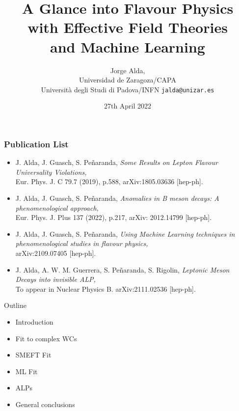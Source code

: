 \documentclass[mathserif, 10pt]{beamer}
\title[A Glance into Flavour Physics...]{A Glance into Flavour Physics \\with Effective Field Theories\\ and Machine Learning}
\author[Jorge Alda]{Jorge Alda,\\ Universidad de Zaragoza/CAPA\\
Università degli Studi di Padova/INFN \hspace{2em} \texttt{jalda@unizar.es} }
\date[PhD Thesis]{27th April 2022}
\begin{document}
\begin{frame}

\titlepage

\end{frame}

\begin{frame}\frametitle{Publication List}

    \begin{itemize}
        \item J. Alda, J. Guasch, S. Peñaranda,
              \textit{Some Results on Lepton Flavour Universality Violations,}\\
              Eur. Phys. J. C 79.7 (2019), p.588, arXiv:1805.03636 [hep-ph].
        \item J. Alda, J. Guasch, S. Peñaranda, \textit{Anomalies in B meson decays: A phenomenological approach,}\\
              Eur. Phys. J. Plus 137 (2022), p.217, arXiv: 2012.14799 [hep-ph].
        \item J. Alda, J. Guasch, S. Peñaranda,
              \textit{Using Machine Learning techniques in phenomenological studies in flavour physics,}\\
              arXiv:2109.07405 [hep-ph].
        \item J. Alda, A. W. M. Guerrera, S. Peñaranda, S. Rigolin,
              \textit{Leptonic Meson Decays into invisible ALP,}\\
To appear in Nuclear Physics B. arXiv:2111.02536 [hep-ph].
    \end{itemize}

\end{frame}


\begin{frame}[plain]%
\begin{block}{\Large Outline}
    \begin{itemize}
        \item Introduction
        \item Fit to complex WCs
        \item SMEFT Fit
        \item ML Fit
        \item ALPs
        \item General conclusions
    \end{itemize}
\end{block}
\end{frame}
\end{document}
